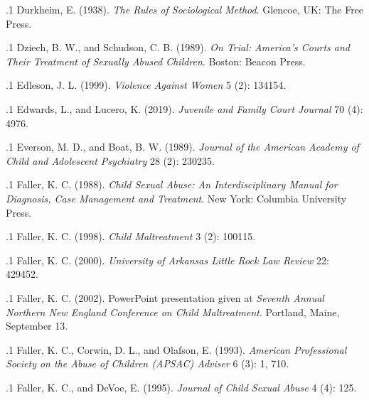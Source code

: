 \documentclass[11pt, twoside]{article}
\begin{document}
{\p.1{%
Durkheim, E. (1938). \textit{The Rules of Sociological Method}.
Glencoe, UK: The Free Press.
}%

\p.1{%
Dziech, B. W., and Schudson, C. B. (1989). \textit{On Trial: America’s Courts and Their
Treatment of Sexually Abused Children}. Boston: Beacon Press.\vspace{-1em}
}%

\p.1{%
Edleson, J. L. (1999).  \textit{Violence Against Women} 5 (2): 134\ndash{}154.
}%

\p.1{%
Edwards, L., and Lucero, K. (2019).  \textit{Juvenile and Family Court Journal} 70 (4): 49\ndash{}76.
}%

\p.1{%
Everson, M. D., and Boat, B. W. (1989).  \textit{Journal of the American Academy of Child and Adolescent
Psychiatry} 28 (2): 230\ndash{}235.
}%

\p.1{%
Faller, K. C. (1988). \textit{Child Sexual Abuse: An Interdisciplinary Manual for Diagnosis,
Case Management and Treatment}. New York: Columbia University Press.
}%

\p.1{%
Faller, K. C. (1998).  \textit{Child Maltreatment} 3 (2): 100\ndash{}115.
}%

\p.1{%
Faller, K. C. (2000).  \textit{University of Arkansas Little Rock Law Review} 22: 429\ndash{}452.
}%

\p.1{%
Faller, K. C. (2002). 
PowerPoint presentation given at \textit{Seventh Annual Northern New England Conference on Child
Maltreatment}. Portland, Maine, September 13.
}%

\p.1{%
Faller, K. C., Corwin, D. L., and Olafson, E. (1993).  \textit{American Professional Society on
the Abuse of Children (APSAC) Adviser} 6 (3): 1, 7\ndash{}10.
}%

\p.1{%
Faller, K. C., and DeVoe, E. (1995). 
\textit{Journal of Child Sexual Abuse} 4 (4): 1\ndash{}25.
}%

}
\end{document}
